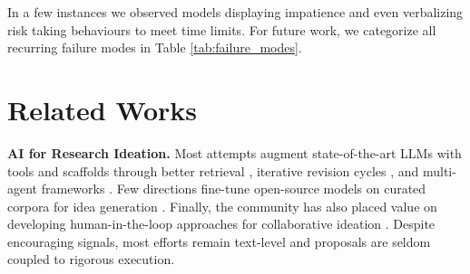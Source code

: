 \documentclass[11pt]{article}
\let\cite\citep
\theoremstyle{plain}
\theoremstyle{definition}
\theoremstyle{remark}
\begin{document}



In a few instances we observed models displaying impatience and even verbalizing risk taking behaviours to meet time limits.
For future work, we categorize all recurring failure modes in Table \ref{tab:failure_modes}. 

\section{Related Works}

\textbf{AI for Research Ideation.} 
Most attempts augment state-of-the-art LLMs with tools and scaffolds through better retrieval \cite{li2024chain, liu2025researchbenchbenchmarkingllmsscientific}, iterative revision cycles \cite{baek-etal-2025-researchagent, yang-etal-2024-large-language}, and multi-agent frameworks \cite{su-etal-2025-many, yu2025researchtown}. Few directions fine-tune open-source models on curated corpora for idea generation \cite{weng2025cycleresearcher, oneill2025sparkssciencehypothesisgeneration, goel2025trainingaicoscientistsusing}. Finally, the community has also placed value on developing human-in-the-loop approaches for collaborative ideation \cite{radensky2025scideatorhumanllmscientificidea, Pu_2025, garikaparthi-etal-2025-iris}. Despite encouraging signals, most efforts remain text-level and proposals are seldom coupled to rigorous execution.
\end{document}
